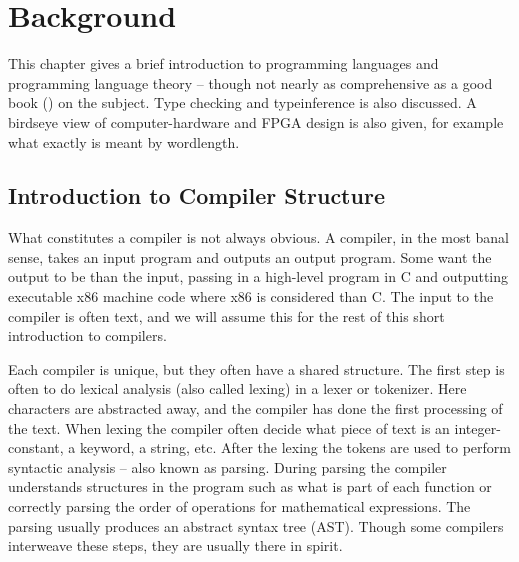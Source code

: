 \chapter{Background}
\label{chaBackground}
This chapter gives a brief introduction to programming languages and programming language theory -- though not nearly as comprehensive as a good book (\cite{src:DragonBook, src:CraftingInterp}) on the subject. Type checking and typeinference is also discussed. A birdseye view of computer-hardware and FPGA design is also given, for example what exactly is meant by wordlength.

% 

\section{Introduction to Compiler Structure}
What constitutes a compiler is not always obvious. A compiler, in the most banal sense, takes an input program and outputs an output program. Some want the output to be  than the input, passing in a high-level program in C and outputting executable x86 machine code where x86 is considered  than C. The input to the compiler is often text, and we will assume this for the rest of this short introduction to compilers.

Each compiler is unique, but they often have a shared structure. The first step is often to do lexical analysis (also called lexing) in a lexer or tokenizer. Here characters are abstracted away, and the compiler has done the first processing of the text. When lexing the compiler often decide what piece of text is an integer-constant, a keyword, a string, etc. After the lexing the tokens are used to perform syntactic analysis -- also known as parsing. During parsing the compiler understands structures in the program such as what is part of each function or correctly parsing the order of operations for mathematical expressions. The parsing usually produces an abstract syntax tree (AST). Though some compilers interweave these steps, they are usually there in spirit.

